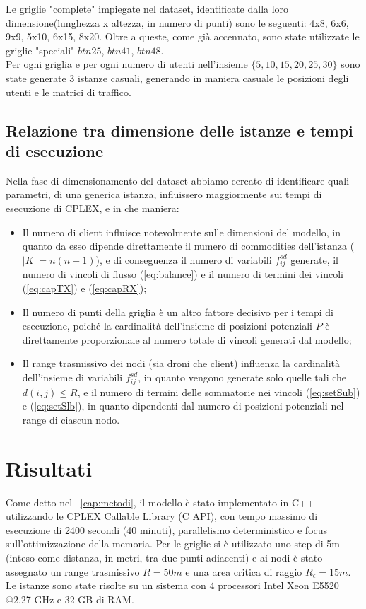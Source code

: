 Le griglie "complete" impiegate nel dataset, identificate dalla loro dimensione(lunghezza x altezza, in numero di punti) sono le seguenti: 4x8, 6x6, 9x9, 5x10, 6x15, 8x20. Oltre a queste, come già accennato, sono state utilizzate le griglie "speciali" $btn25$, $btn41$, $btn48$.\\
Per ogni griglia e per ogni numero di utenti nell'insieme $\{5, 10, 15, 20, 25, 30\}$ sono state generate 3 istanze casuali, generando in maniera casuale le posizioni degli utenti e le matrici di traffico. \\

\subsection{Relazione tra dimensione delle istanze e tempi di esecuzione}
Nella fase di dimensionamento del dataset abbiamo cercato di identificare quali parametri, di una generica istanza, influissero maggiormente sui tempi di esecuzione di CPLEX, e in che maniera:
\begin{itemize}
	\item Il numero di client influisce notevolmente sulle dimensioni del modello, in quanto da esso dipende direttamente il numero di commodities dell'istanza ($|K| = n(n-1)$), e di conseguenza il numero di variabili $f_{ij}^{sd}$ generate, il numero di vincoli di flusso (\ref{eq:balance}) e il numero di termini dei vincoli (\ref{eq:capTX}) e (\ref{eq:capRX}); 
	\item Il numero di punti della griglia è un altro fattore decisivo per i tempi di esecuzione, poiché la cardinalità dell'insieme di posizioni potenziali $P$ è direttamente proporzionale al numero totale di vincoli generati dal modello;
	\item Il range trasmissivo dei nodi (sia droni che client) influenza la cardinalità dell'insieme di variabili $f_{ij}^{sd}$, in quanto vengono generate solo quelle tali che $d(i,j) \leq R$, e il numero di termini delle sommatorie nei vincoli (\ref{eq:setSub}) e (\ref{eq:setSlb}), in quanto dipendenti dal numero di posizioni potenziali nel range di ciascun nodo. 
\end{itemize} 

\section{Risultati}
Come detto nel \chaptername\ \ref{cap:metodi}, il modello è stato implementato in C++ utilizzando le CPLEX Callable Library (C API), con tempo massimo di esecuzione di 2400 secondi (40 minuti), parallelismo deterministico e focus sull'ottimizzazione della memoria. Per le griglie si è utilizzato uno step di 5m (inteso come distanza, in metri, tra due punti adiacenti) e ai nodi è stato assegnato un range trasmissivo $R = 50m$ e una area critica di raggio $R_\epsilon = 15m$. \\
Le istanze sono state risolte su un sistema con 4 processori Intel Xeon E5520 @2.27 GHz e 32 GB di RAM. \\

